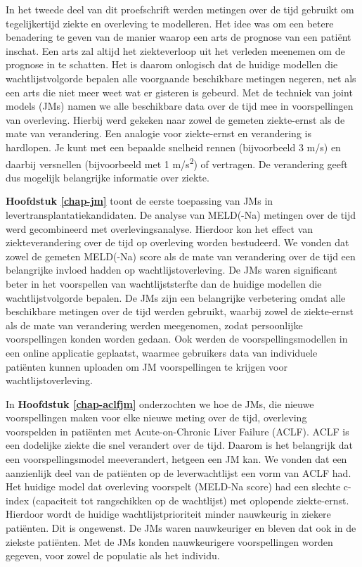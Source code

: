 \documentclass[11pt,english,]{book} %
\begin{document}
In het tweede deel van dit proefschrift werden metingen over de tijd gebruikt om tegelijkertijd ziekte en overleving te modelleren. Het idee was om een betere benadering te geven van de manier waarop een arts de prognose van een patiënt inschat. Een arts zal altijd het ziekteverloop uit het verleden meenemen om de prognose in te schatten. Het is daarom onlogisch dat de huidige modellen die wachtlijstvolgorde bepalen alle voorgaande beschikbare metingen negeren, net als een arts die niet meer weet wat er gisteren is gebeurd. Met de techniek van joint models (JMs) namen we alle beschikbare data over de tijd mee in voorspellingen van overleving. Hierbij werd gekeken naar zowel de gemeten ziekte-ernst als de mate van verandering. Een analogie voor ziekte-ernst en verandering is hardlopen. Je kunt met een bepaalde snelheid rennen (bijvoorbeeld 3 m/s) en daarbij versnellen (bijvoorbeeld met 1 m/s\textsuperscript{2}) of vertragen. De verandering geeft dus mogelijk belangrijke informatie over ziekte.

\textbf{Hoofdstuk \ref{chap-jm}} toont de eerste toepassing van JMs in levertransplantatiekandidaten. De analyse van MELD(-Na) metingen over de tijd werd gecombineerd met overlevingsanalyse. Hierdoor kon het effect van ziekteverandering over de tijd op overleving worden bestudeerd. We vonden dat zowel de gemeten MELD(-Na) score als de mate van verandering over de tijd een belangrijke invloed hadden op wachtlijstoverleving. De JMs waren significant beter in het voorspellen van wachtlijststerfte dan de huidige modellen die wachtlijstvolgorde bepalen. De JMs zijn een belangrijke verbetering omdat alle beschikbare metingen over de tijd werden gebruikt, waarbij zowel de ziekte-ernst als de mate van verandering werden meegenomen, zodat persoonlijke voorspellingen konden worden gedaan. Ook werden de voorspellingsmodellen in een online applicatie geplaatst, waarmee gebruikers data van individuele patiënten kunnen uploaden om JM voorspellingen te krijgen voor wachtlijstoverleving.

In \textbf{Hoofdstuk \ref{chap-aclfjm}} onderzochten we hoe de JMs, die nieuwe voorspellingen maken voor elke nieuwe meting over de tijd, overleving voorspelden in patiënten met Acute-on-Chronic Liver Failure (ACLF). ACLF is een dodelijke ziekte die snel verandert over de tijd. Daarom is het belangrijk dat een voorspellingsmodel meeverandert, hetgeen een JM kan. We vonden dat een aanzienlijk deel van de patiënten op de leverwachtlijst een vorm van ACLF had. Het huidige model dat overleving voorspelt (MELD-Na score) had een slechte c-index (capaciteit tot rangschikken op de wachtlijst) met oplopende ziekte-ernst. Hierdoor wordt de huidige wachtlijstprioriteit minder nauwkeurig in ziekere patiënten. Dit is ongewenst. De JMs waren nauwkeuriger en bleven dat ook in de ziekste patiënten. Met de JMs konden nauwkeurigere voorspellingen worden gegeven, voor zowel de populatie als het individu.
\end{document}
